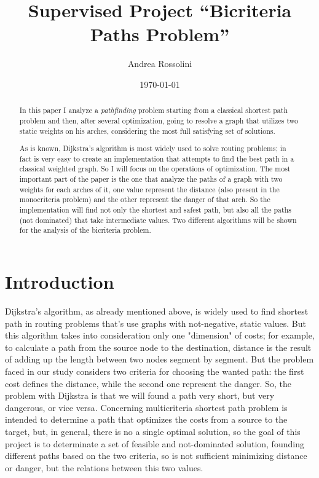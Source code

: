 \documentclass[a4paper,12pt]{report}
\title{Supervised Project ``Bicriteria Paths Problem''}
\author{Andrea Rossolini}
\date{\today}
\begin{document}
 
\maketitle

\begin{abstract}
In this paper I analyze a \textit{pathfinding} problem starting from a classical shortest path problem and then, after several optimization, going to resolve a graph that utilizes two static weights on his arches, considering the most full satisfying set of solutions.

As is known, Dijkstra's algorithm is most widely used to solve routing problems; in fact is very easy to create an implementation that attempts to find the best path in a classical weighted graph. So I will focus on the operations of optimization.
%
The most important part of the paper is the one that analyze the paths of a graph with two weights for each arches of it, one value represent the distance (also present in the monocriteria problem) and the other represent the danger of that arch. So the implementation will find not only the shortest and safest path, but also all the paths (not dominated) that take intermediate values. Two different algorithms will be shown for the analysis of the bicriteria problem.
\end{abstract}

\tableofcontents

\chapter{Introduction}
Dijkstra's algorithm, as already mentioned above, is widely used to find shortest path in routing problems that's use graphs with not-negative, static values. But this algorithm takes into consideration only one "dimension" of costs; for example, to calculate a path from the source node to the destination, distance is the result of adding up the length between two nodes segment by segment.
%
But the problem faced in our study considers two criteria for choosing the wanted path: the first cost defines the distance, while the second one represent the danger. So, the problem with Dijkstra is that we will found a path very short, but very dangerous, or vice versa. Concerning multicriteria shortest path problem is intended to determine a path that optimizes the costs from a source to the target, but, in general, there is no a single optimal solution, so the goal of this project is to determinate a set of feasible and not-dominated solution, founding different paths 
based on the two criteria, so is not sufficient minimizing distance or danger, but the relations between this two values.
\vspace{5mm}
\end{document}
